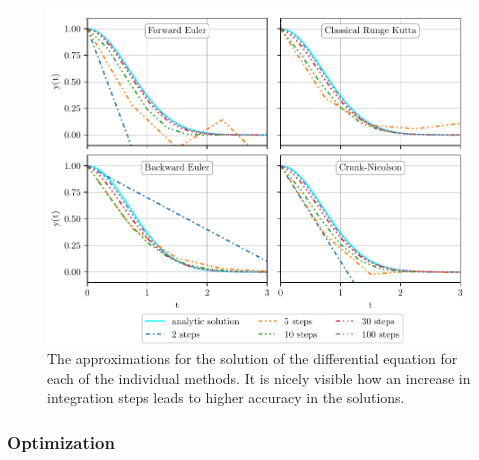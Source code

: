 \documentclass{aa}
\begin{document}
\begin{figure}[htbp]
    \centering
    \captionsetup{width = 0.9 \textwidth}
    \includegraphics[width=17cm]{../Task_01/ODE_solvers.pdf}
    \caption{The approximations for the solution of the differential equation for each of the
    individual methods. It is nicely visible how an increase in integration steps leads to
    higher accuracy in the solutions.}
    \label{fig:ODE_solvers}
\end{figure}

\subsubsection*{Optimization}%
\label{ssub:optimization}
\end{document}
